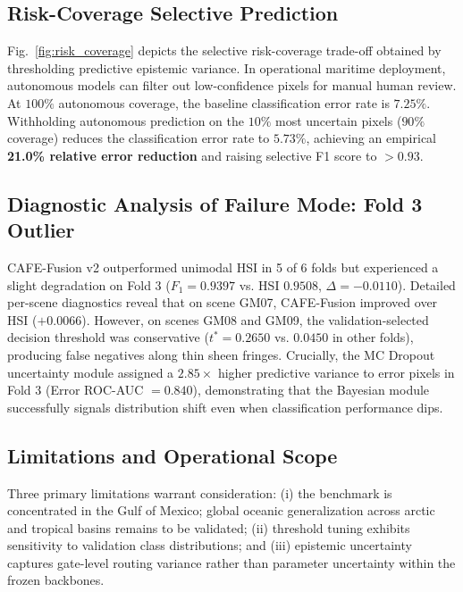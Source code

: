 \documentclass[conference]{IEEEtran}
\begin{document}
\subsection{Risk-Coverage Selective Prediction}
Fig.~\ref{fig:risk_coverage} depicts the selective risk-coverage trade-off obtained by thresholding predictive epistemic variance. In operational maritime deployment, autonomous models can filter out low-confidence pixels for manual human review. At $100\%$ autonomous coverage, the baseline classification error rate is $7.25\%$. Withholding autonomous prediction on the $10\%$ most uncertain pixels ($90\%$ coverage) reduces the classification error rate to $5.73\%$, achieving an empirical \textbf{21.0\% relative error reduction} and raising selective F1 score to $>0.93$.

\subsection{Diagnostic Analysis of Failure Mode: Fold 3 Outlier}
CAFE-Fusion v2 outperformed unimodal HSI in 5 of 6 folds but experienced a slight degradation on Fold 3 ($F_1 = 0.9397$ vs. HSI $0.9508$, $\Delta = -0.0110$). Detailed per-scene diagnostics reveal that on scene GM07, CAFE-Fusion improved over HSI ($+0.0066$). However, on scenes GM08 and GM09, the validation-selected decision threshold was conservative ($t^* = 0.2650$ vs. $0.0450$ in other folds), producing false negatives along thin sheen fringes. Crucially, the MC Dropout uncertainty module assigned a $2.85\times$ higher predictive variance to error pixels in Fold 3 (Error ROC-AUC $= 0.840$), demonstrating that the Bayesian module successfully signals distribution shift even when classification performance dips.

\subsection{Limitations and Operational Scope}
Three primary limitations warrant consideration: (i) the benchmark is concentrated in the Gulf of Mexico; global oceanic generalization across arctic and tropical basins remains to be validated; (ii) threshold tuning exhibits sensitivity to validation class distributions; and (iii) epistemic uncertainty captures gate-level routing variance rather than parameter uncertainty within the frozen backbones.

\end{document}
